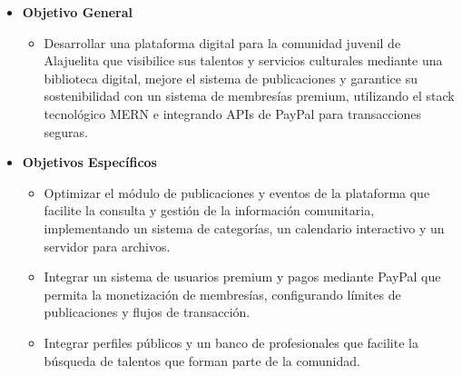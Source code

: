 %






\begin{itemize}
    \item \textbf{Objetivo General}
    \begin{itemize}
        \item Desarrollar una plataforma digital para la comunidad juvenil de Alajuelita que visibilice sus talentos y servicios culturales mediante una biblioteca digital, mejore el sistema de publicaciones y garantice su sostenibilidad con un sistema de membresías premium, utilizando el stack tecnológico MERN e integrando APIs de PayPal para transacciones seguras.

    \end{itemize}
    \item \textbf{Objetivos Específicos}
    \begin{itemize}
        \item Optimizar el módulo de publicaciones y eventos de la plataforma que facilite la consulta y gestión de la información comunitaria, implementando un sistema de categorías, un calendario interactivo y un servidor para archivos.
         \item Integrar un sistema de usuarios premium y pagos mediante PayPal que permita la monetización de membresías, configurando límites de publicaciones y flujos de transacción.
        \item Integrar perfiles públicos y un banco de profesionales que facilite la búsqueda de talentos que forman parte de la comunidad.
    \end{itemize}
\end{itemize}

